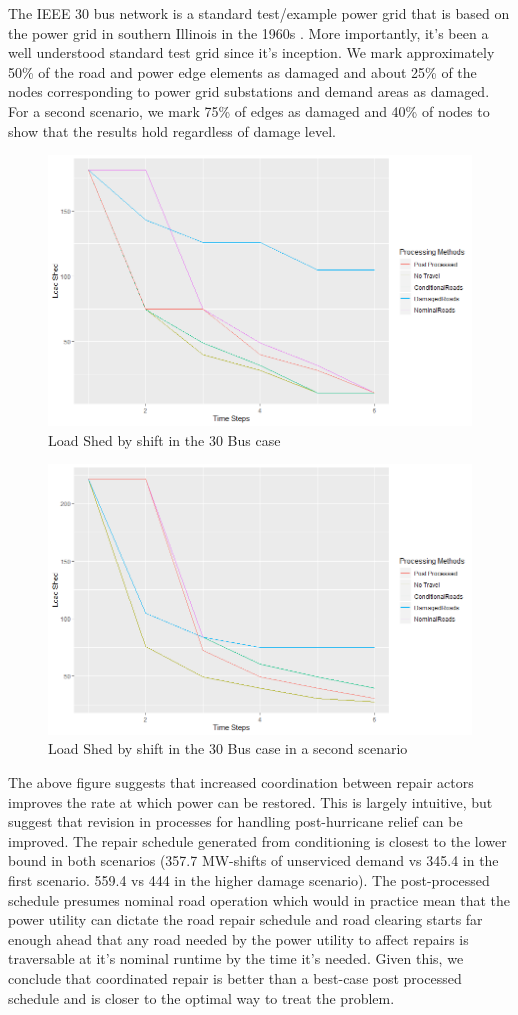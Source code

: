 \documentclass[10pt]{article}
\begin{document}
The IEEE 30 bus network is a standard test/example power grid that is based on the power grid in southern Illinois in the 1960s . More importantly, it's been a well understood standard test grid since it's inception. We mark approximately 50\% of the road and power edge elements as damaged and about 25\% of the nodes corresponding to power grid substations and demand areas as damaged. For a second scenario, we mark 75\% of edges as damaged and 40\% of nodes to show that the results hold regardless of damage level.
\begin{figure}[H]
	\centering
	\caption{Load Shed by shift in the 30 Bus case}
\includegraphics[width=.75\textwidth, height=0.5\textheight,keepaspectratio]{Rplot37.png}

\end{figure}
\begin{figure}[H]
	\centering
	\caption{Load Shed by shift in the 30 Bus case in a second scenario}
	\includegraphics[width=.75\textwidth, height=0.5\textheight,keepaspectratio]{Rplot30Scenario2.png}
	
\end{figure}
The above figure suggests that increased coordination between repair actors improves the rate at which power can be restored. This is largely intuitive, but suggest that revision in processes for handling post-hurricane relief can be improved. The repair schedule generated from conditioning is closest to the lower bound in both scenarios (357.7 MW-shifts of unserviced demand vs 345.4 in the first scenario. 559.4 vs 444 in the higher damage scenario). The post-processed schedule presumes nominal road operation which would in practice mean that the power utility can dictate the road repair schedule and road clearing starts far enough ahead that any road needed by the power utility to affect repairs is traversable at it's nominal runtime by the time it's needed. Given this, we conclude that coordinated repair is better than a best-case post processed schedule and is closer to the optimal way to treat the problem.
\end{document}

